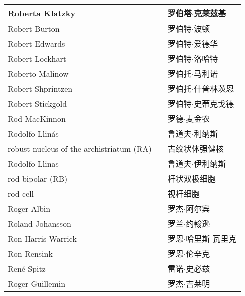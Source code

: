 \begin{longtable}{lll}
	\midrule
	Roberta Klatzky   && 罗伯塔$\cdot$克莱兹基  \\
	
	\midrule
	Robert Burton   && 罗伯特$\cdot$波顿  \\
	
	\midrule
	Robert Edwards   && 罗伯特$\cdot$爱德华  \\
	
	\midrule
	Robert Lockhart   && 罗伯特$\cdot$洛哈特  \\
	
	\midrule
	Roberto Malinow   && 罗伯托$\cdot$马利诺  \\
	
	\midrule
	Robert Shprintzen   && 罗伯托$\cdot$什普林茨恩  \\
	
	\midrule
	Robert Stickgold   && 罗伯特$\cdot$史蒂克戈德  \\
	
	\midrule
	Rod MacKinnon   && 罗德$\cdot$麦金农  \\
	
	\midrule
	Rodolfo Llinás   && 鲁道夫$\cdot$利纳斯  \\
	
	\midrule
	robust nucleus of the archistriatum (RA)   && 古纹状体强健核  \\
	
	\midrule
	Rodolfo Llinas   && 鲁道夫$\cdot$伊利纳斯  \\
	
	\midrule
	rod bipolar (RB)  && 杆状双极细胞  \\
	
	\midrule
	rod cell   && 视杆细胞  \\
	
	\midrule
	Roger Albin   && 罗杰$\cdot$阿尔宾  \\
	
	\midrule
	Roland Johansson   && 罗兰$\cdot$约翰逊  \\
	
	\midrule
	Ron Harris-Warrick   && 罗恩$\cdot$哈里斯-瓦里克  \\
	
	\midrule
	Ron Rensink   && 罗恩$\cdot$伦辛克  \\
	
	\midrule
	René Spitz   && 雷诺$\cdot$史必兹  \\
	
	\midrule
	Roger Guillemin   && 罗杰$\cdot$吉莱明  \\
	

\end{longtable}

